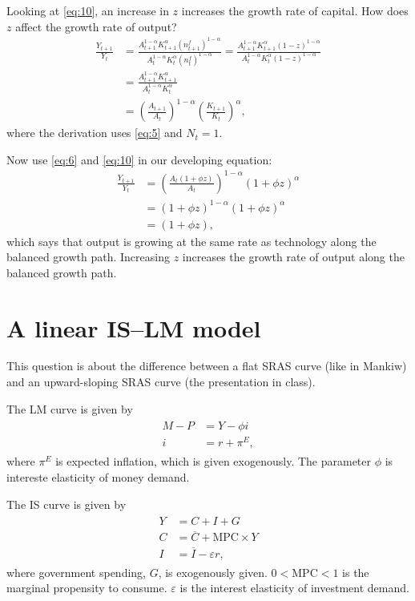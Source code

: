\documentclass[12pt]{pracjourn_rwr}
\theoremstyle{definition}
\theoremstyle{remark}
\begin{document}
Looking at \eqref{eq:10}, an increase in $z$ increases the growth rate of capital.
How does $z$ affect the growth rate of output?
\begin{align*}
\frac{Y_{t+1}}{Y_{t}} &=
\frac{A_{t+1}^{1-\alpha}K_{t+1}^{\alpha} \left( n_{t+1}^{f} \right)^{1-\alpha}}{
  A_{t}^{1-\alpha}K_{t}^{\alpha} \left( n_{t}^{f} \right)^{1-\alpha}} =
\frac{A_{t+1}^{1-\alpha}K_{t+1}^{\alpha} \left( 1-z \right)^{1-\alpha}}{
  A_{t}^{1-\alpha}K_{t}^{\alpha} \left( 1-z \right)^{1-\alpha}} \\
&= \frac{A_{t+1}^{1-\alpha}K_{t+1}^{\alpha}}{A_{t}^{1-\alpha}K_{t}^{\alpha}} \\
&= \left( \frac{A_{t+1}}{A_{t}} \right)^{1-\alpha} \left( \frac{K_{t+1}}{K_{t}} \right)^{\alpha},
\end{align*}
where the derivation uses \eqref{eq:5} and $N_{t}= 1$.

Now use \eqref{eq:6} and \eqref{eq:10} in our developing equation:
\begin{align*}
\frac{Y_{t+1}}{Y_{t}} &=
\left( \frac{A_{t}\left( 1+\phi z \right)}{A_{t}} \right)^{1-\alpha} \left( 1+\phi z \right)^{\alpha} \\
&= \left( 1+\phi z \right)^{1-\alpha} \left( 1+\phi z \right)^{\alpha} \\
&= \left( 1+\phi z \right),
\end{align*}
which says that output is growing at the same rate as technology along the balanced growth path.
Increasing $z$ increases the growth rate of output along the balanced growth path. 

\section{A linear IS--LM model}

This question is about the difference between a flat SRAS curve (like in Mankiw) and
an upward-sloping SRAS curve (the presentation in class).

The LM curve is given by
\begin{align}
\begin{split}
\label{eq:11}
M - P &= Y - \phi i \\
i &= r + \pi^{E},
\end{split}
\end{align}
where $\pi^{E}$ is expected inflation, which is given exogenously.
The parameter $\phi$ is intereste elasticity of money demand.

The IS curve is given by
\begin{align}
\begin{split}
\label{eq:12}
Y &= C + I + G \\
C &= \overline{C} + \text{MPC} \times Y \\
I &= \overline{I} - \varepsilon r,
\end{split}
\end{align}
where government spending, $G$, is exogenously given.
$0 < \text{MPC} < 1$ is the marginal propensity to consume.
$\varepsilon$ is the interest elasticity of investment demand.
\end{document}
